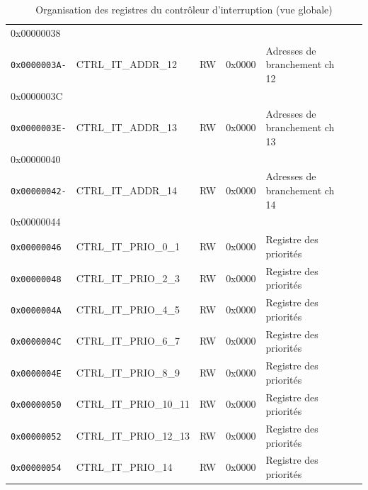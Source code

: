 \begin{table}[H]
\begin{tabular}{llllll}
		{0x00000038}         &                        &               &                &                                      \\
		\rhline
		\texttt{0x0000003A-} & CTRL\_IT\_ADDR\_12     & RW            & 0x0000         & Adresses de branchement ch 12        \\
		{0x0000003C}         &                        &               &                &                                      \\
		\rhline
		\texttt{0x0000003E-} & CTRL\_IT\_ADDR\_13     & RW            & 0x0000         & Adresses de branchement ch 13        \\
		{0x00000040}         &                        &               &                &                                      \\
		\rhline
		\texttt{0x00000042-} & CTRL\_IT\_ADDR\_14     & RW            & 0x0000         & Adresses de branchement ch 14        \\
		{0x00000044}         &                        &               &                &                                      \\
		\rhline
		\texttt{0x00000046}  & CTRL\_IT\_PRIO\_0\_1   & RW            & 0x0000         & Registre des priorités               \\
		\rhline
		\texttt{0x00000048}  & CTRL\_IT\_PRIO\_2\_3   & RW            & 0x0000         & Registre des priorités               \\
		\rhline
		\texttt{0x0000004A}  & CTRL\_IT\_PRIO\_4\_5   & RW            & 0x0000         & Registre des priorités               \\
		\rhline
		\texttt{0x0000004C}  & CTRL\_IT\_PRIO\_6\_7   & RW            & 0x0000         & Registre des priorités               \\
		\rhline
		\texttt{0x0000004E}  & CTRL\_IT\_PRIO\_8\_9   & RW            & 0x0000         & Registre des priorités               \\
		\rhline
		\texttt{0x00000050}  & CTRL\_IT\_PRIO\_10\_11 & RW            & 0x0000         & Registre des priorités               \\
		\rhline
		\texttt{0x00000052}  & CTRL\_IT\_PRIO\_12\_13 & RW            & 0x0000         & Registre des priorités               \\
		\rhline
		\texttt{0x00000054}  & CTRL\_IT\_PRIO\_14     & RW            & 0x0000         & Registre des priorités               \\
		\hline
	\end{tabular}
	\caption{Organisation des registres du contrôleur d'interruption (vue globale)}
	\label{tab:reg_map}
\end{table}

